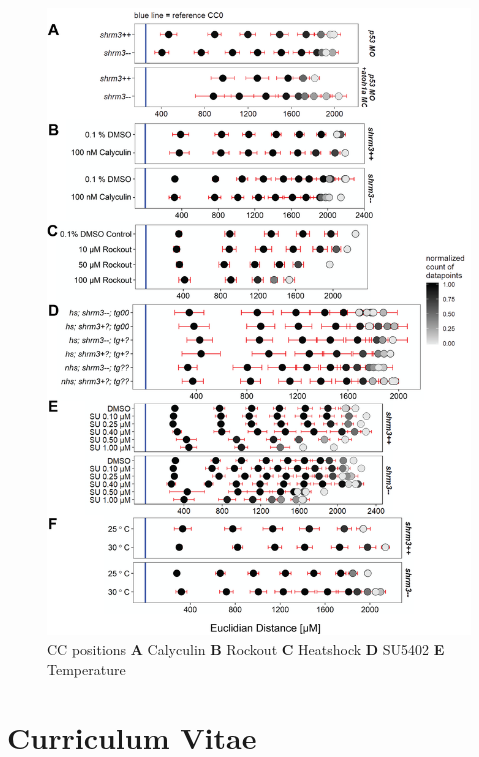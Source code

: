 \documentclass[11pt,singlespacinge,twoside]{reedthesis} %
\theoremstyle{definition}
\theoremstyle{definition}
\theoremstyle{definition}
\theoremstyle{remark}
\begin{document}
\begin{figure}

{\centering \includegraphics[width=0.85\linewidth]{figures/supp/cc_positions} 

}

\caption[Heatshock CC positions]{CC positions \textbf{A} Calyculin \textbf{B} Rockout \textbf{C} Heatshock \textbf{D} SU5402 \textbf{E} Temperature}\label{fig:supppos}
\end{figure}
\hypertarget{curriculum-vitae}{%
\chapter*{Curriculum Vitae}\label{curriculum-vitae}}

 \hrulefill
\vspace{0.2cm}


\end{document}
